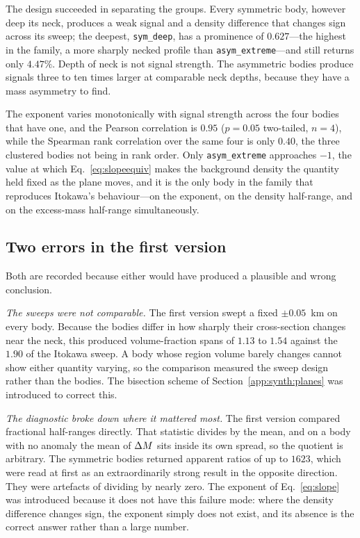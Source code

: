 The design succeeded in separating the groups. Every symmetric body, however
deep its neck, produces a weak signal and a density difference that changes
sign across its sweep; the deepest, \texttt{sym\_deep}, has a prominence of
$0.627$---the highest in the family, a more sharply necked profile than
\texttt{asym\_extreme}---and still returns only
$4.47\%$. Depth of neck is not signal strength. The asymmetric bodies produce
signals three to ten times larger at comparable neck depths, because they have
a mass asymmetry to find.

The exponent varies monotonically with signal strength across the four bodies
that have one, and the Pearson correlation is $0.95$ ($p = 0.05$ two-tailed, $n = 4$), while
the Spearman rank correlation over the same four is only $0.40$, the three
clustered bodies not being in rank order. Only \texttt{asym\_extreme}
approaches $-1$, the value at which Eq.~\eqref{eq:slopeequiv} makes the
background density the quantity held fixed as the plane moves, and it is the only body in the family that reproduces Itokawa's
behaviour---on the exponent, on the density half-range, and on the excess-mass
half-range simultaneously.

\subsection{Two errors in the first version}
\label{app:synth:errors}

Both are recorded because either would have produced a plausible and wrong
conclusion.

\emph{The sweeps were not comparable.} The first version swept a fixed
$\pm0.05$~km on every body. Because the bodies differ in how sharply their
cross-section changes near the neck, this produced volume-fraction spans of
$1.13$ to $1.54$ against the $1.90$ of the Itokawa sweep. A body whose region
volume barely changes cannot show either quantity varying, so the comparison
measured the sweep design rather than the bodies. The bisection scheme of
Section~\ref{app:synth:planes} was introduced to correct this.

\emph{The diagnostic broke down where it mattered most.} The first version
compared fractional half-ranges directly. That statistic divides by the mean,
and on a body with no anomaly the mean of $\Delta M$ sits inside its own spread,
so the quotient is arbitrary. The symmetric bodies returned apparent ratios of
up to $1623$, which were read at first as an extraordinarily strong result in
the opposite direction. They were artefacts of dividing by nearly zero. The
exponent of Eq.~\eqref{eq:slope} was introduced because it does not have this
failure mode: where the density difference changes sign, the exponent simply
does not exist, and its absence is the correct answer rather than a large
number.

